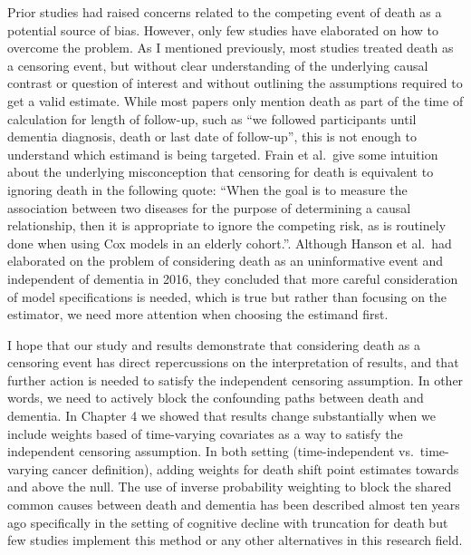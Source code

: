 \documentclass[
]{book}
\begin{document}
Prior studies had raised concerns related to the competing event of death as a potential source of bias\autocite{ospina2020,hayes_larson2020}. However, only few studies have elaborated on how to overcome the problem\autocite{hanson2016}. As I mentioned previously, most studies treated death as a censoring event\autocite{roe2010,driver2012,nudelmann2014,freedman2016,frain2017,bowles2017,prinelli2018}, but without clear understanding of the underlying causal contrast or question of interest and without outlining the assumptions required to get a valid estimate. While most papers only mention death as part of the time of calculation for length of follow-up, such as ``we followed participants until dementia diagnosis, death or last date of follow-up'', this is not enough to understand which estimand is being targeted. Frain et al.~give some intuition about the underlying misconception that censoring for death is equivalent to ignoring death in the following quote: ``When the goal is to measure the association between two diseases for the purpose of determining a causal relationship, then it is appropriate to ignore the competing risk, as is routinely done when using Cox models in an elderly cohort.''\autocite{frain2017}. Although Hanson et al.~had elaborated on the problem of considering death as an uninformative event and independent of dementia in 2016\autocite{hanson2016}, they concluded that more careful consideration of model specifications is needed, which is true but rather than focusing on the estimator, we need more attention when choosing the estimand first.

I hope that our study and results demonstrate that considering death as a censoring event has direct repercussions on the interpretation of results, and that further action is needed to satisfy the independent censoring assumption. In other words, we need to actively block the confounding paths between death and dementia. In Chapter 4 we showed that results change substantially when we include weights based of time-varying covariates as a way to satisfy the independent censoring assumption. In both setting (time-independent vs.~time-varying cancer definition), adding weights for death shift point estimates towards and above the null. The use of inverse probability weighting to block the shared common causes between death and dementia has been described almost ten years ago specifically in the setting of cognitive decline with truncation for death\autocite{weave2012} but few studies implement this method or any other alternatives\autocite{vangeloven2014} in this research field.
\end{document}
